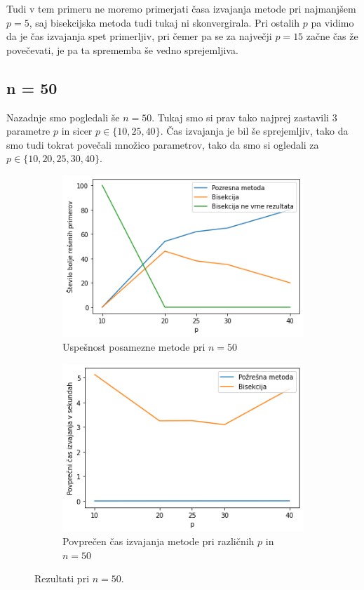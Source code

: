 \documentclass[a4paper]{article}
\begin{document}
Tudi v tem primeru ne moremo primerjati časa izvajanja metode pri najmanjšem $p = 5$, saj bisekcijska metoda tudi tukaj ni skonvergirala. Pri ostalih $p$ pa vidimo da je čas izvajanja spet primerljiv, pri čemer pa se za največji $p = 15$ začne čas že povečevati, je pa ta sprememba še vedno sprejemljiva.

\subsection{n = 50}
Nazadnje smo pogledali še $n = 50$. Tukaj smo si prav tako najprej zastavili $3$ parametre $p$ in sicer $p \in \{10, 25, 40\}$. Čas izvajanja je bil še sprejemljiv, tako da smo tudi tokrat povečali množico parametrov, tako da smo si ogledali za $p \in \{10, 20, 25, 30, 40\}$. 

\begin{figure}[H]
	\begin{subfigure}[t]{0.45\textwidth}
		\centering
		\includegraphics[width=\textwidth]{n_50.png}
		\caption{Uspešnost posamezne metode pri $n = 50$}
		\label{n_50_count}
	\end{subfigure}
	\hfill
	\begin{subfigure}[t]{0.45\textwidth}
		\centering
		\includegraphics[width=\textwidth]{n_50_time.png}
		\caption{Povprečen čas izvajanja metode pri različnih $p$ in $n = 50$}
		\label{n_50_time}
	\end{subfigure}
    \caption{Rezultati pri $n = 50$.}
    \label{fig:n_50}
\end{figure}
\end{document}
